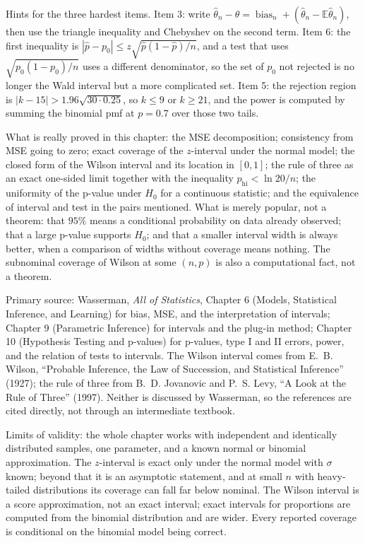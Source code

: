 \begin{latihan}
Hints for the three hardest items. Item 3: write
$\hat\theta_n-\theta=\operatorname{bias}_n+(\hat\theta_n-\mathbb{E}\hat\theta_n)$,
then use the triangle inequality and Chebyshev on the second term. Item 6: the first inequality
is $|\hat p-p_0|\le z\sqrt{\hat p(1-\hat p)/n}$, and a test that uses
$\sqrt{p_0(1-p_0)/n}$ uses a different denominator, so the set of $p_0$ not
rejected is no longer the Wald interval but a more complicated set. Item 5: the rejection
region is $|k-15|>1.96\sqrt{30\cdot0.25}$, so $k\le9$ or $k\ge21$, and
the power is computed by summing the binomial pmf at $p=0.7$ over those two tails.
\end{latihan}

\begin{untukpeneliti}
What is really proved in this chapter: the MSE decomposition; consistency from MSE going to
zero; exact coverage of the $z$-interval under the normal model; the closed form of the Wilson
interval and its location in $[0,1]$; the rule of three as an exact one-sided limit together
with the inequality $p_{\mathrm{hi}}<\ln 20/n$; the uniformity of the p-value under $H_0$ for a
continuous statistic; and the equivalence of interval and test in the pairs mentioned.
What is merely popular, not a theorem: that $95\%$ means a conditional probability on
data already observed; that a large p-value supports $H_0$; and that a smaller interval width
is always better, when a comparison of widths without coverage means nothing. The subnominal
coverage of Wilson at some $(n,p)$ is also a computational fact, not a theorem.

Primary source: Wasserman, \emph{All of Statistics}, Chapter 6 (Models, Statistical
Inference, and Learning) for bias, MSE, and the interpretation of intervals; Chapter 9
(Parametric Inference) for intervals and the plug-in method; Chapter 10 (Hypothesis Testing
and p-values) for p-values, type I and II errors, power, and the relation of tests to
intervals. The Wilson interval comes from E.~B. Wilson, ``Probable Inference, the Law of
Succession, and Statistical Inference'' (1927); the rule of three from B.~D. Jovanovic and
P.~S. Levy, ``A Look at the Rule of Three'' (1997). Neither is discussed by Wasserman, so the
references are cited directly, not through an intermediate textbook.

Limits of validity: the whole chapter works with independent and identically distributed
samples, one parameter, and a known normal or binomial approximation. The $z$-interval is
exact only under the normal model with $\sigma$ known; beyond that it is an asymptotic
statement, and at small $n$ with heavy-tailed distributions its coverage can fall far below
nominal. The Wilson interval is a score approximation, not an exact interval; exact intervals
for proportions are computed from the binomial distribution and are wider. Every reported
coverage is conditional on the binomial model being correct.


\end{untukpeneliti}
